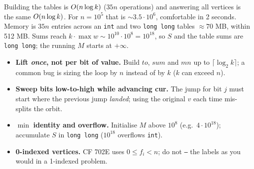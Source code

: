 \begin{complexitybox}
Building the tables is \(O(n\log k)\) (\(35n\) operations) and answering all
vertices is the same \(O(n\log k)\).  For \(n=10^5\) that is \(\sim 3.5\cdot 10^6\),
comfortable in 2 seconds.  Memory is \(35n\) entries across an \texttt{int} and two
\texttt{long long} tables \(\approx 70\) MB, within 512 MB.  Sums reach
\(k\cdot\max w\sim 10^{10}\cdot 10^8=10^{18}\), so \(S\) and the table sums are
\texttt{long long}; the running \(M\) starts at \(+\infty\).
\end{complexitybox}

\begin{hardeningbox}
\begin{itemize}[nosep,leftmargin=1.4em]
\item \textbf{Lift \emph{once}, not per bit of value.}  Build \(\mathit{to}\),
\(\mathit{sum}\) and \(\mathit{mn}\) up to \(\lceil\log_2 k\rceil\); a common bug is sizing
the loop by \(n\)
instead of by \(k\) (\(k\) can exceed \(n\)).
\item \textbf{Sweep bits low-to-high while advancing cur.}  The jump for bit \(j\)
must start where the previous jump \emph{landed}; using the original \(v\) each time
mis-splits the orbit.
\item \(\min\) \textbf{identity and overflow.}  Initialise \(M\) above \(10^8\) (e.g.\ \(4\cdot
10^{18}\)); accumulate \(S\) in \texttt{long long} (\(10^{18}\) overflows \texttt{int}).
\item \textbf{0-indexed vertices.}  CF 702E uses \(0\le f_i<n\); do not \texttt{--} the labels
as you would in a 1-indexed problem.
\end{itemize}
\end{hardeningbox}

